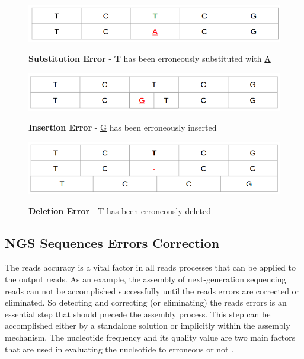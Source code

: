 \documentclass{llncs}
\begin{document}
\begin{figure}
	\centering
	\includegraphics[width=.911\linewidth]{./figs/ErrCrr-1}
	\label{fig:fig7}
	\caption[caption]{\textbf{Substitution Error} - \textbf{T} has been erroneously substituted with \underline{A}}
\end{figure}

\begin{figure}
	\centering
	\includegraphics[width=.911\linewidth]{./figs/ErrCrr-2}
	\label{fig:fig8}
	\caption[caption]{\textbf{Insertion Error} - \underline{G} has been erroneously inserted}
\end{figure}

\begin{figure}
	\centering
	\includegraphics[width=.911\linewidth]{./figs/ErrCrr-3}
	\label{fig:fig9}
	\caption[caption]{\textbf{Deletion Error} - \underline{T} has been erroneously deleted}
\end{figure}

\subsection{NGS Sequences Errors Correction}
The reads accuracy is a vital factor in all reads processes that can be applied to the output reads. As an example, the assembly of next-generation sequencing reads can not be accomplished successfully until the reads errors are corrected or eliminated. So detecting and correcting (or eliminating) the reads errors is an essential step that should precede the assembly process. This step can be accomplished either by a standalone solution or implicitly within the assembly mechanism. The nucleotide frequency and its quality value are two main factors that are used in evaluating the nucleotide to erroneous or not \cite{ErrCorr}. 
\end{document}
